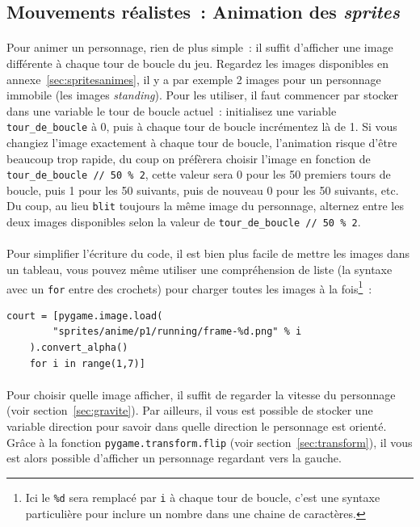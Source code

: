 \subsection{Mouvements réalistes~: Animation des \emph{sprites}}
\label{sec:animation}

\paragraph{}
Pour animer un personnage, rien de plus simple~: il suffit d'afficher une image différente à chaque tour de boucle du jeu.
Regardez les images disponibles en annexe~\ref{sec:spritesanimes}, il y a par exemple 2 images pour un personnage immobile (les images \emph{standing}).
Pour les utiliser, il faut commencer par stocker dans une variable le tour de boucle actuel~: initialisez une variable \texttt{tour\_de\_boucle} à 0, puis à chaque tour de boucle incrémentez là de 1.
Si vous changiez l'image exactement à chaque tour de boucle, l'animation risque d'être beaucoup trop rapide, du coup on préfèrera choisir l'image en fonction de \texttt{tour\_de\_boucle // 50 \% 2}, cette valeur sera 0 pour les 50 premiers tours de boucle, puis 1 pour les 50 suivants, puis de nouveau 0 pour les 50 suivants, etc.
Du coup, au lieu \texttt{blit} toujours la même image du personnage, alternez entre les deux images disponibles selon la valeur de \texttt{tour\_de\_boucle // 50 \% 2}.

\paragraph{}
Pour simplifier l'écriture du code, il est bien plus facile de mettre les images dans un tableau, vous pouvez même utiliser une compréhension de liste (la syntaxe avec un \texttt{for} entre des crochets) pour charger toutes les images à la fois\footnote{Ici le \texttt{\%d} sera remplacé par \texttt{i} à chaque tour de boucle, c'est une syntaxe particulière pour inclure un nombre dans une chaine de caractères.}~:
\begin{verbatim}
court = [pygame.image.load(
        "sprites/anime/p1/running/frame-%d.png" % i
    ).convert_alpha()
    for i in range(1,7)]
\end{verbatim}

\paragraph{}
Pour choisir quelle image afficher, il suffit de regarder la vitesse du personnage (voir section~\ref{sec:gravite}).
Par ailleurs, il vous est possible de stocker une variable direction pour savoir dans quelle direction le personnage est orienté.
Grâce à la fonction \texttt{pygame.transform.flip} (voir section~\ref{sec:transform}), il vous est alors possible d'afficher un personnage regardant vers la gauche.

